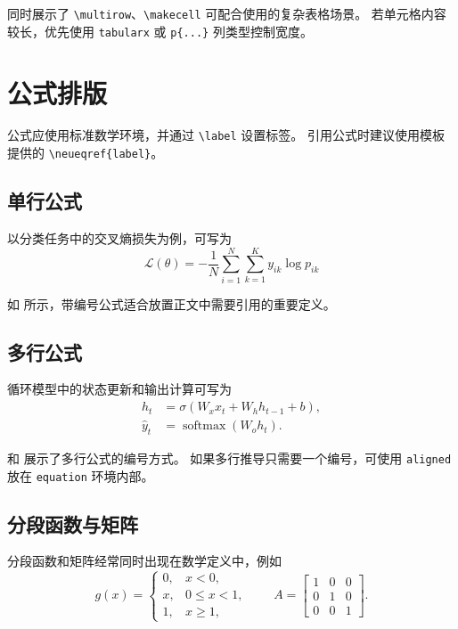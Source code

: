  同时展示了 \verb|\multirow|、\verb|\makecell| 可配合使用的复杂表格场景。
若单元格内容较长，优先使用 \texttt{tabularx} 或 \texttt{p\{...\}} 列类型控制宽度。

\section{公式排版}

公式应使用标准数学环境，并通过 \verb|\label| 设置标签。
引用公式时建议使用模板提供的 \verb|\neueqref{label}|。

\subsection{单行公式}
以分类任务中的交叉熵损失为例，可写为
\begin{equation}
  \mathcal{L}(\theta)
  = - \frac{1}{N}\sum_{i=1}^{N}\sum_{k=1}^{K} y_{ik}\log p_{ik}
  \label{eq:ch0-loss}
\end{equation}

如  所示，带编号公式适合放置正文中需要引用的重要定义。

\subsection{多行公式}
循环模型中的状态更新和输出计算可写为
\begin{align}
  h_t       & = \sigma(W_x x_t + W_h h_{t-1} + b), \label{eq:ch0-state} \\
  \hat{y}_t & = \operatorname{softmax}(W_o h_t). \label{eq:ch0-output}
\end{align}

 和  展示了多行公式的编号方式。
如果多行推导只需要一个编号，可使用 \texttt{aligned} 放在 \texttt{equation} 环境内部。

\subsection{分段函数与矩阵}
分段函数和矩阵经常同时出现在数学定义中，例如
\begin{equation}
  g(x)=
  \begin{cases}
    0, & x < 0,       \\
    x, & 0 \le x < 1, \\
    1, & x \ge 1,
  \end{cases}
  \qquad
  A =
  \begin{bmatrix}
    1 & 0 & 0 \\
    0 & 1 & 0 \\
    0 & 0 & 1
  \end{bmatrix}.
  \label{eq:ch0-piecewise}
\end{equation}

